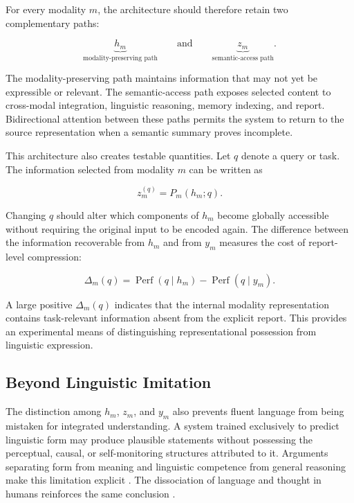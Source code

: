 For every modality $m$, the architecture should therefore retain two complementary paths:

\begin{equation}
\underbrace{h_m}_{\text{modality-preserving path}}
\qquad\text{and}\qquad
\underbrace{z_m}_{\text{semantic-access path}}.
\label{eq:dual-path}
\end{equation}

The modality-preserving path maintains information that may not yet be expressible or relevant. The semantic-access path exposes selected content to cross-modal integration, linguistic reasoning, memory indexing, and report. Bidirectional attention between these paths permits the system to return to the source representation when a semantic summary proves incomplete.

This architecture also creates testable quantities. Let $q$ denote a query or task. The information selected from modality $m$ can be written as

\begin{equation}
z_m^{(q)} = P_m(h_m;q).
\label{eq:query-conditioned-projection}
\end{equation}

Changing $q$ should alter which components of $h_m$ become globally accessible without requiring the original input to be encoded again. The difference between the information recoverable from $h_m$ and from $y_m$ measures the cost of report-level compression:

\begin{equation}
\Delta_m(q)
=
\operatorname{Perf}(q\mid h_m)
-
\operatorname{Perf}(q\mid y_m).
\label{eq:report-compression-gap}
\end{equation}

A large positive $\Delta_m(q)$ indicates that the internal modality representation contains task-relevant information absent from the explicit report. This provides an experimental means of distinguishing representational possession from linguistic expression.

\subsection{Beyond Linguistic Imitation}
\label{subsec:beyond-linguistic-imitation}

The distinction among $h_m$, $z_m$, and $y_m$ also prevents fluent language from being mistaken for integrated understanding. A system trained exclusively to predict linguistic form may produce plausible statements without possessing the perceptual, causal, or self-monitoring structures attributed to it. Arguments separating form from meaning and linguistic competence from general reasoning make this limitation explicit \cite{bender2020climbing,mahowald2024dissociating}. The dissociation of language and thought in humans reinforces the same conclusion \cite{fedorenko2024communication}.

